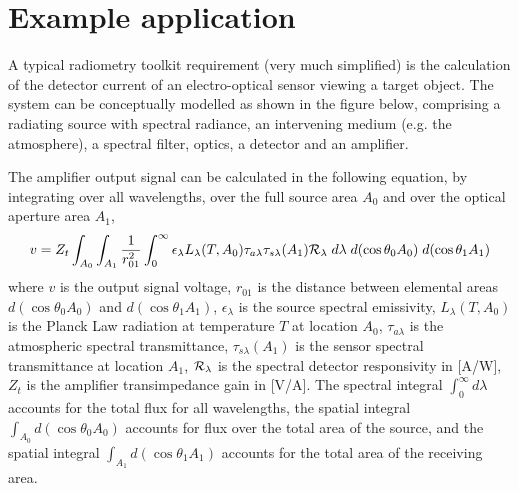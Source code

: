 \documentclass[a4paper,10pt,english]{sphinxmanual}
\begin{document}
\section{Example application}
\label{introduction:example-application}
A typical radiometry toolkit requirement (very much simplified) is the calculation
of the detector current of an electro-optical sensor viewing a target object.
The system can be conceptually modelled as shown in the figure below,
comprising a radiating source with
spectral radiance, an intervening medium (e.g. the atmosphere), a spectral filter,
optics, a detector and an amplifier.

{\hfill{}\hfill}

The amplifier output signal
can be calculated in the following equation,  by integrating  over
all wavelengths, over the full source area \(A_0\) and over the optical
aperture area \(A_1\),
\begin{gather}
\begin{split}v=
Z_t
\int_{A_0}
\int_{A_1}
\frac{1}{r_{01}^2}
\int_0^\infty
\epsilon_\lambda L_\lambda(T,A_0)\tau_{a\lambda}\tau_{s\lambda}(A_1){\cal R}_\lambda
\;d\lambda
\;d(\cos\theta_0 A_0)
\;d(\cos\theta_1 A_1)\end{split}\notag
\end{gather}
where
\(v\) is the output signal voltage,
\(r_{01}\) is the distance between elemental areas
\(d(\cos\theta_0 A_0)\) and
\(d(\cos\theta_1 A_1)\),
\(\epsilon_\lambda\) is the source spectral emissivity,
\(L_\lambda(T,A_0)\) is the Planck Law radiation at temperature
\(T\) at location \(A_0\),
\(\tau_{a\lambda}\) is the atmospheric spectral transmittance,
\(\tau_{s\lambda}(A_1)\) is the sensor spectral transmittance at location \(A_1\),
\({\cal R}_\lambda\) is the spectral detector responsivity in {[}A/W{]},
\(Z_t\) is the amplifier transimpedance gain in {[}V/A{]}.
The spectral integral \(\int_0^\infty d\lambda\) accounts for the total
flux for all wavelengths, the spatial integral
\(\int_{A_0}d(\cos\theta_0 A_0)\)
accounts for flux over the total area of the source, and
the spatial integral
\(\int_{A_1}d(\cos\theta_1 A_1)\) accounts for the total area of the receiving area.
\end{document}
